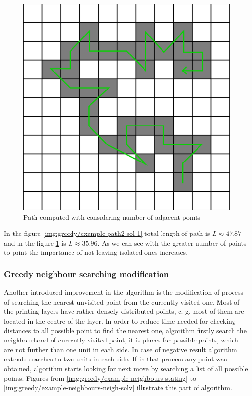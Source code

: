 \documentclass[titlepage]{article}
\newcommand{\multifigcaption}{\captionsetup{justification=justified}}
\begin{document}
\begin{figure}[H]
\begin{center}
\begin{minipage}{.45\linewidth}
 			\includegraphics[width=\textwidth]{img/greedy/example-path2-sol-2.png}
			\multifigcaption
 			\caption{Path computed with considering number of adjacent points \newline \vspace{4mm}}
 			\label{img:greedy/example-path2-sol-2}

 		\end{minipage}
 	\end{center}
 \end{figure}
 
 In the figure \ref{img:greedy/example-path2-sol-1} total length of path is $L \approx 47.87$ and in the figure \ref{img:greedy/example-path2-sol-2} is $L \approx 35.96$. As we can see with the greater number of points to print the importance of not leaving isolated ones increases.
 
\subsubsection{Greedy neighbour searching modification}
 
 Another introduced improvement in the algorithm is the modification of process of searching the nearest unvisited point from the currently visited one. Most of the printing layers have rather densely distributed points, e. g. most of them are located in the centre of the layer. In order to reduce time needed for checking distances to all possible point to find the nearest one, algorithm firstly search the neighbourhood of currently visited point, it is places for possible points, which are not further than one unit in each side. In case of negative result algorithm extends searches to two units in each side. If in that process any point was obtained, algorithm starts looking for next move by searching a list of all possible points. Figures from \ref{img:greedy/example-neighbours-stating} to \ref{img:greedy/example-neighbours-neigh-solv} illustrate this part of algorithm.
 
\end{document}

